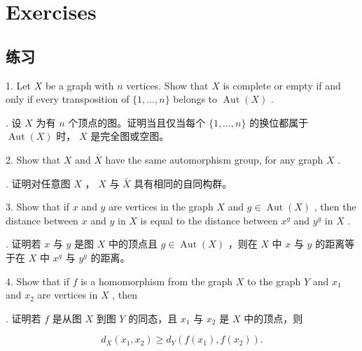 \documentclass[10pt]{article}
\begin{document}
\section*{Exercises}

\begin{tcolorbox}\relax
\section*{练习}
\end{tcolorbox}

1. Let \(X\) be a graph with \(n\) vertices. Show that \(X\) is complete or empty if and only if every transposition of \(\{ 1,\ldots ,n\}\) belongs to \(\operatorname{Aut}\left( X\right)\) .

\begin{tcolorbox}. 设 \(X\) 为有 \(n\) 个顶点的图。证明当且仅当每个 \(\{ 1,\ldots ,n\}\) 的换位都属于 \(\operatorname{Aut}\left( X\right)\) 时， \(X\) 是完全图或空图。
\end{tcolorbox}

2. Show that \(X\) and \(\bar{X}\) have the same automorphism group, for any graph \(X\) .

\begin{tcolorbox}. 证明对任意图 \(X\) ， \(X\) 与 \(\bar{X}\) 具有相同的自同构群。
\end{tcolorbox}

3. Show that if \(x\) and \(y\) are vertices in the graph \(X\) and \(g \in  \operatorname{Aut}\left( X\right)\) , then the distance between \(x\) and \(y\) in \(X\) is equal to the distance between \({x}^{g}\) and \({y}^{g}\) in \(X\) .

\begin{tcolorbox}. 证明若 \(x\) 与 \(y\) 是图 \(X\) 中的顶点且 \(g \in  \operatorname{Aut}\left( X\right)\) ，则在 \(X\) 中 \(x\) 与 \(y\) 的距离等于在 \(X\) 中 \({x}^{g}\) 与 \({y}^{g}\) 的距离。
\end{tcolorbox}

4. Show that if \(f\) is a homomorphism from the graph \(X\) to the graph \(Y\) and \({x}_{1}\) and \({x}_{2}\) are vertices in \(X\) , then

\begin{tcolorbox}. 证明若 \(f\) 是从图 \(X\) 到图 \(Y\) 的同态，且 \({x}_{1}\) 与 \({x}_{2}\) 是 \(X\) 中的顶点，则
\end{tcolorbox}

\[
{d}_{X}\left( {{x}_{1},{x}_{2}}\right)  \geq  {d}_{Y}\left( {f\left( {x}_{1}\right) ,f\left( {x}_{2}\right) }\right) .
\]
\end{document}

